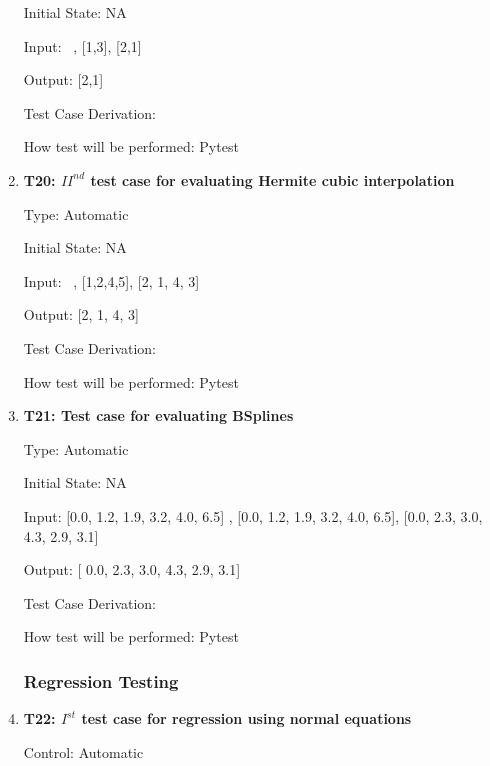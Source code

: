 \documentclass[12pt, titlepage]{article}
\begin{document}
\begin{enumerate}
Initial State: NA 

Input: ~\newline 
[1,3], [1,3], [2,1]						

Output: [2,1]

Test Case Derivation: \cite{HermiteCubic2}

How test will be performed: Pytest

\item{\textbf{T20: ${II}^{nd}$ test case for evaluating Hermite cubic 
interpolation}}

Type: Automatic

Initial State: NA 

Input: ~\newline 
 [1,2,4,5], [1,2,4,5], [2, 1, 4, 
 3] 				

Output: [2, 1, 4, 3]

Test Case Derivation: \cite{HermiteCubic2}

How test will be performed: Pytest

\item{\textbf{T21: Test case for evaluating BSplines}}

Type: Automatic

Initial State: NA 

Input: [0.0, 1.2, 1.9, 3.2, 4.0, 6.5] , [0.0, 1.2, 
1.9, 3.2, 4.0, 6.5], 
[0.0, 2.3, 3.0, 4.3, 2.9, 3.1] 

Output: [ 0.0,  2.3,  3.0,  4.3,  2.9,  3.1]

Test Case Derivation: \cite{BSpline}

How test will be performed: Pytest







\subsubsection{Regression Testing}\label{ResgressionTesting}



\item{\textbf{T22: $I^{st}$ test case for regression using normal equations} \\}

Control: Automatic


\end{enumerate}
\end{document}
